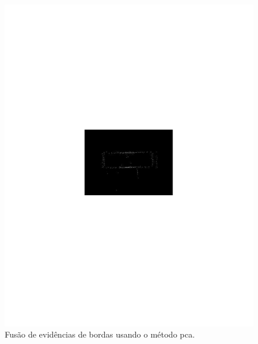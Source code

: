 \documentclass[conference]{IEEEtran}
\begin{document}
\begin{figure}[hbt]
	\includegraphics[scale=0.5]{flevoland_fusao_swt_crop.pdf}
	\caption{Fusão de evidências de bordas usando o método pca.}
\label{fig_07}
\end{figure}
\end{document}
